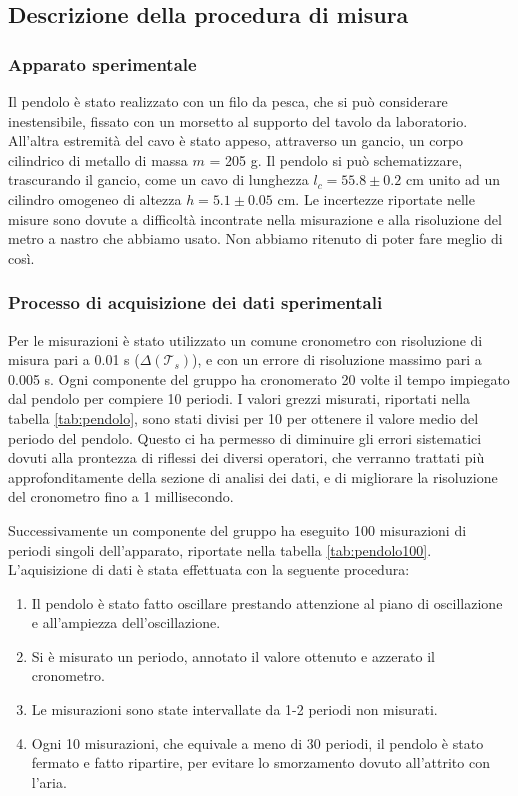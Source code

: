 \subsection{Descrizione della procedura di misura}

\subsubsection{Apparato sperimentale}

Il pendolo è stato realizzato con un filo da pesca, che si può considerare
inestensibile, fissato con un morsetto al supporto del tavolo da laboratorio.
All'altra estremità del cavo è stato appeso, attraverso un gancio, un corpo
cilindrico di metallo di massa $m$ = 205 g. Il pendolo si può schematizzare,
trascurando il gancio, come un cavo di lunghezza $l_c = 55.8 \pm 0.2$ 
cm unito ad un cilindro omogeneo di altezza $h = 5.1 \pm 0.05$ cm.
Le incertezze riportate nelle misure sono dovute a difficoltà incontrate nella
misurazione e alla risoluzione del metro a nastro che abbiamo usato.
Non abbiamo ritenuto di poter fare meglio di così.

\subsubsection{Processo di acquisizione dei dati sperimentali}

Per le misurazioni è stato utilizzato un comune cronometro con risoluzione di
misura pari a 0.01 s ($\Delta(\mathcal{T}_{s})$), e con un errore di risoluzione massimo pari a 0.005 s. Ogni componente del gruppo ha
cronomerato 20 volte il tempo impiegato dal pendolo per compiere 10 periodi.
I valori grezzi misurati, riportati nella tabella \ref{tab:pendolo}, sono stati divisi per
10 per ottenere il valore medio del periodo del pendolo. Questo ci ha permesso
di diminuire gli errori sistematici dovuti alla prontezza di riflessi dei diversi
operatori, che verranno trattati più approfonditamente della sezione di analisi dei
dati, e di migliorare la risoluzione del cronometro fino a 1 millisecondo.

Successivamente un componente del gruppo ha eseguito 100 misurazioni di periodi
singoli dell'apparato, riportate nella tabella \ref{tab:pendolo100}. L'aquisizione di dati è stata
effettuata con la seguente procedura:

\begin{enumerate}
    \item{Il pendolo è stato fatto oscillare prestando attenzione al piano di oscillazione
        e all'ampiezza dell'oscillazione.}

    \item{Si è misurato un periodo, annotato il valore ottenuto e azzerato il cronometro.}

    \item{Le misurazioni sono state intervallate da 1-2 periodi non misurati.}

    \item{Ogni 10 misurazioni, che equivale a meno di 30 periodi, il pendolo è stato fermato
        e fatto ripartire, per evitare lo smorzamento dovuto all'attrito con l'aria.}
\end{enumerate}

